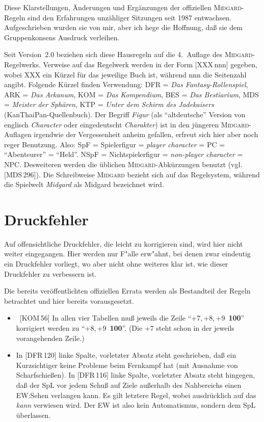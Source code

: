 \documentclass[10pt,a4paper,germanpar]{article}
\begin{document}
Diese Klarstellungen, Änderungen und Ergänzungen der offiziellen
\textsc{Midgard}-Regeln sind den Erfahrungen un\-zäh\-liger Sitzungen
seit 1987 entwachsen. Aufgeschrieben wurden sie von mir, aber ich hege die
Hoffnung, daß sie dem Gruppenkonsens Ausdruck verleihen.

Seit Version~2.0 beziehen sich diese Hausregeln auf die 4.~Auflage des
\textsc{Midgard}-Regelwerks. Verweise auf das Regelwerk werden in der Form
[XXX\,nnn] gegeben, wobei XXX ein Kürzel für das jeweilige Buch ist,
während nnn die Seitenzahl angibt. Folgende Kürzel finden Verwendung:
DFR = \emph{Das Fantasy-Rollenspiel}, ARK = \emph{Das Arkanum}, KOM =
\emph{Das Kompendium}, BES = \emph{Das Bestiarium}, MDS =
\emph{Meister der Sphären}, KTP = \emph{Unter dem Schirm des
  Jadekaisers} (KanThaiPan-Quellenbuch). Der Begriff \emph{Figur} (als
"`altdeutsche"' Version von englisch \emph{Character} oder
eingedeutscht \emph{Charakter}) ist in den jüngeren
\textsc{Midgard}-Auflagen irgendwie der Vergessenheit anheim gefallen,
erfreut sich hier aber noch reger Benutzung. Also: SpF = Spielerfigur
= \emph{player character} = PC = "`Abenteurer"' = "`Held"'. NSpF =
Nichtspielerfigur = \emph{non-player character} = NPC. Desweiteren
werden die üblichen \textsc{Midgard}-Abkürzungen benutzt
(vgl. [MDS\,296]). Die Schreibweise \textsc{Midgard} bezieht sich auf
das Regelsystem, während die Spielwelt \emph{Midgard} als Midgard
bezeichnet wird.


\section{Druckfehler}

Auf offensichtliche Druckfehler, die leicht zu korrigieren sind, wird
hier nicht weiter eingegangen. Hier werden nur F"alle erw"ahnt, bei
denen zwar eindeutig ein Druckfehler vorliegt, wo aber nicht ohne
weiteres klar ist, wie dieser Druckfehler zu verbessern ist.

Die bereits veröffentlichten offiziellen Errata werden als Bestandteil
der Regeln betrachtet und hier bereits vorausgesetzt.

\begin{itemize}
\item\ [KOM\,56] In allen vier Tabellen muß jeweils die Zeile
  "`+7,\,+8,\,+9~\textbf{100}"' korrigiert werden zu
  "`+8,\,+9~\textbf{100}"'. (Die +7 steht schon in der jeweils
  vorangehenden Zeile.) 
\item In [DFR\,120] linke Spalte, vorletzter Absatz steht geschrieben, daß ein
  Kurzsichtiger keine Probleme beim Fernkampf hat (mit Ausnahme von
  Scharfschießen).  In [DFR\,116] linke Spalte, vorletzter Absatz steht
  hingegen, daß der SpL vor jedem Schuß auf Ziele außerhalb des
  Nahbereichs einen EW:Sehen verlangen kann. Es gilt letztere Regel, wobei
  ausdrücklich auf das \emph{kann} verwiesen wird.  Der EW ist also kein
  Automatismus, sondern dem SpL überlassen.
\end{itemize}
\end{document}
